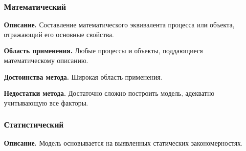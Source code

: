 
\subsubsection*{\textbf{Математический}}
\textbf{Описание.} Составление математического эквивалента процесса или объекта, отражающий его основные свойства.

\textbf{Область применения.} Любые процессы и объекты, поддающиеся математическому описанию.

\textbf{Достоинства метода.} Широкая область применения.

\textbf{Недостатки метода.} Достаточно сложно построить модель, адекватно учитывающую все факторы.

\subsubsection*{\textbf{Статистический}}
\textbf{Описание.} Модель основывается на выявленных статических закономерностях.

